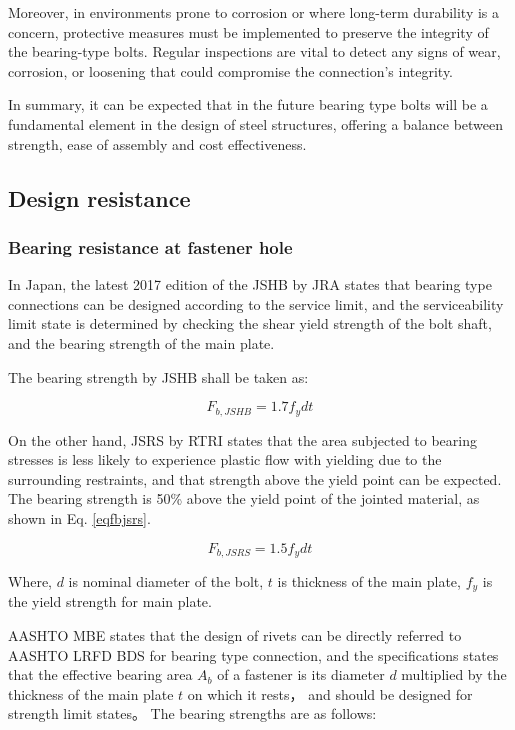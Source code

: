 Moreover, in environments prone to corrosion or where long-term durability is a concern, protective measures must be implemented to preserve the integrity of the bearing-type bolts. Regular inspections are vital to detect any signs of wear, corrosion, or loosening that could compromise the connection's integrity.

In summary, it can be expected that in the future bearing type bolts will be a fundamental element in the design of steel structures, offering a balance between strength, ease of assembly and cost effectiveness.

\subsection{Design resistance}

\subsubsection{Bearing resistance at fastener hole}

In Japan, the latest 2017 edition of the \ac{JSHB} by \ac{JRA} \cite{douji2017} states that bearing type connections can be designed according to the service limit, and the serviceability limit state is determined by checking the shear yield strength of the bolt shaft, and the bearing strength of the main plate.

The bearing strength by JSHB shall be taken as:

\begin{equation}
    F_{b,JSHB} = 1.7 f_y dt
\end{equation}

On the other hand, \ac{JSRS} by \ac{RTRI} \cite{rtri2009Design} states that the area subjected to bearing stresses is less likely to experience plastic flow with yielding due to the surrounding restraints, and that strength above the yield point can be expected. The bearing strength is 50\% above the yield point of the jointed material, as shown in Eq. \ref{eqfbjsrs}.

\begin{equation}\label{eqfbjsrs}
    F_{b,JSRS} = 1.5 f_y dt
\end{equation}


Where, $d$ is nominal diameter of the bolt, $t$ is thickness of the main plate, $f_y$ is the yield strength for main plate.

AASHTO MBE \cite{aashtombe2018Manual} states that the design of rivets can be directly referred to AASHTO LRFD BDS for bearing type connection, and the specifications states that the effective bearing area $A_{b}$ of a fastener is its diameter $d$ multiplied by the thickness of the main plate $t$ on which it rests， and should be designed for strength limit states。 The bearing strengths are as follows:

